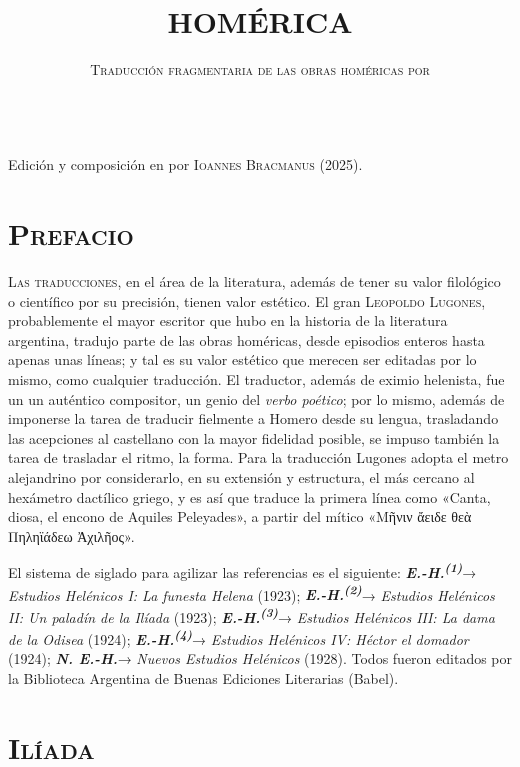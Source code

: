 \documentclass[11pt,twoside]{article}
\title{\fontsize{40}{20}\selectfont\textbf{HOMÉRICA}}
\date{\vspace{40pt} \textsc{Traducción fragmentaria de las obras homéricas por}\\\vspace*{14pt}{\huge\textsc{\textbf{Leopoldo Lugones}}}\\\fontsize{60}{11}\selectfont{\vfill\textbf{\texttt{\LaTeX}}}}
\newcommand{\ehuno}{\emph{\textbf{E.-H.\textsuperscript{(1)}}}}
\newcommand{\ehdos}{\emph{\textbf{E.-H.\textsuperscript{(2)}}}}
\newcommand{\ehter}{\emph{\textbf{E.-H.\textsuperscript{(3)}}}}
\newcommand{\ehctr}{\emph{\textbf{E.-H.\textsuperscript{(4)}}}}
\newcommand{\neh}{\emph{\textbf{N. E.-H.}}}
\begin{document}
	\maketitle
\newpage
%
\null
\vfill
\begin{flushright}
	Edición y composición en \texttt{\XeLaTeX} por \textsc{Ioannes Bracmanus} (2025).
\end{flushright}
\newpage
%
\tableofcontents
\newpage
%
\setcounter{page}{1}
\section*{\centering\textsc{Prefacio}}
\par
%
\noindent\textsc{Las traducciones}, en el área de la literatura, además de tener su valor filológico o científico por su precisión, tienen valor estético. El gran \textsc{Leopoldo Lugones}, probablemente el mayor escritor que hubo en la historia de la literatura argentina, tradujo parte de las obras homéricas, desde episodios enteros hasta apenas unas líneas; y tal es su valor estético que merecen ser editadas por lo mismo, como cualquier traducción. El traductor, además de eximio helenista, fue un un auténtico compositor, un genio del \emph{verbo poético}; por lo mismo, además de imponerse la tarea de traducir fielmente a Homero desde su lengua, trasladando las acepciones al castellano con la mayor fidelidad posible, se impuso también la tarea de trasladar el ritmo, la forma. Para la traducción Lugones adopta el metro alejandrino por considerarlo, en su extensión y estructura, el más cercano al hexámetro dactílico griego, y es así que traduce la primera línea como «Canta, diosa, el encono de Aquiles Peleyades», a partir del mítico «Μῆνιν ἄειδε θεὰ Πηληϊάδεω Ἀχιλῆος».\par
%
El sistema de siglado para agilizar las referencias es el siguiente: \ehuno → \emph{Estudios Helénicos I: La funesta Helena} (1923); \ehdos → \emph{Estudios Helénicos II: Un paladín de la Ilíada} (1923); \ehter → \emph{Estudios Helénicos III: La dama de la Odisea} (1924); \ehctr → \emph{Estudios Helénicos IV: Héctor el domador} (1924); \neh → \emph{Nuevos Estudios Helénicos} (1928). Todos fueron editados por la Biblioteca Argentina de Buenas Ediciones Literarias (Babel).\par
\newpage
%
\section*{\raggedleft\fontsize{30}{14}\textsc{Ilíada}}
\repage
%
\setcounter{page}{3}

\repage
%

\repage
%

\repage

\repage
%

\repage
%

\repage
%

\repage
%

%

%
%
\end{document}
